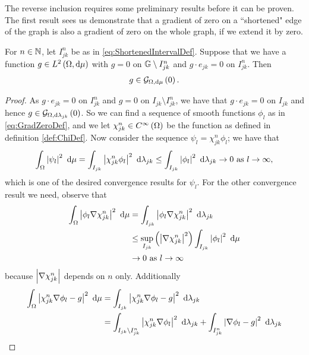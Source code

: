The reverse inclusion requires some preliminary results before it can be proven.
The first result sees us demonstrate that a gradient of zero on a ``shortened" edge of the graph is also a gradient of zero on the whole graph, if we extend it by zero.
\begin{lemma} \label{lem:SegGradExtend}
	For $n\in\mathbb{N}$, let $I_{jk}^n$ be as in \eqref{eq:ShortenedIntervalDef}.
	Suppose that we have a function $g\in L^{2}\left( \Omega,\mathrm{d}\mu \right)$ with $g=0$ on $\mathbb{G}\setminus I_{jk}^{n}$ and $g\cdot e_{jk}=0$ on $I_{jk}^{n}$.
	Then 
	\begin{align*}
		g\in\mathcal{G}_{ \Omega, \mathrm{d}\mu}\left( 0 \right).
	\end{align*}
\end{lemma}
\begin{proof}
	As $g\cdot e_{jk}=0$ on $I_{jk}^{n}$ and $g=0$ on $I_{jk}\setminus I_{jk}^{n}$, we have that $g\cdot e_{jk}=0$ on $I_{jk}$ and hence $g\in\mathcal{G}_{ \Omega, \mathrm{d}\lambda_{jk}}\left( 0 \right)$.
	So we can find a sequence of smooth functions $\phi_l$ as in \eqref{eq:GradZeroDef}, and we let $\chi_{jk}^{n}\in C^{\infty}\left( \Omega \right)$ be the function as defined in definition \ref{def:ChiDef}.
	Now consider the sequence $\psi_l = \chi_{jk}^{n}\phi_l$; we have that
	\begin{align*}
		\int_{\Omega}\left\lvert \psi_l \right\rvert^2 \ \mathrm{d}\mu = \int_{I_{jk}}\left\lvert \chi_{jk}^{n}\phi_l \right\rvert^2 \ \mathrm{d}\lambda_{jk}
		\leq \int_{I_{jk}}\left\lvert \phi_l \right\rvert^2 \ \mathrm{d}\lambda_{jk} \rightarrow0 \ \text{as} \ l \rightarrow\infty,
	\end{align*}
	which is one of the desired convergence results for $\psi_l$.
	For the other convergence result we need, observe that
	\begin{align*}
		\int_{\Omega}\left\lvert \phi_l\nabla\chi_{jk}^{n} \right\rvert^2 \ \mathrm{d}\mu &= \int_{I_{jk}}\left\lvert \phi_l\nabla\chi_{jk}^{n} \right\rvert^2 \ \mathrm{d}\lambda_{jk} \\
		&\leq \sup_{I_{jk}}\left( \left\lvert \nabla\chi_{jk}^{n} \right\rvert^{2} \right)\int_{I_{jk}}\left\lvert \phi_l \right\rvert^2 \ \mathrm{d}\mu \\
		&\rightarrow 0 \ \text{as} \ l \rightarrow\infty
	\end{align*}
	because $\left\lvert \nabla\chi_{jk}^{n} \right\rvert$ depends on $n$ only.
	Additionally
	\begin{align*}
		\integral{\ddom}{\abs{\chi_{jk}^n\grad\phi_l - g}^2}{\ddmes} &= \integral{I_{jk}}{\abs{\chi_{jk}^n\grad\phi_l - g}^2}{\lambda_{jk}} \\
		&= \integral{I_{jk}\setminus I_{jk}^n}{\abs{\chi_{jk}^n\grad\phi_l}^2}{\lambda_{jk}} +  \integral{I_{jk}^n}{\abs{\grad\phi_l - g}^2}{\lambda_{jk}} \\

\end{align*}
\end{proof}

